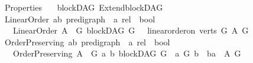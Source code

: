 %
\begin{isabellebody}%
%
%
\isadelimtheory
%
\endisadelimtheory
%
\isatagtheory
{}\isamarkupfalse%
\ Properties\isanewline
\ \ \ blockDAG\ Extend{\isacharunderscore}{\kern0pt}blockDAG\ \isanewline
{}%
\endisatagtheory
{\isafoldtheory}%
%
\isadelimtheory
\isanewline
%
\endisadelimtheory
\isanewline
{}\isamarkupfalse%
\ Linear{\isacharunderscore}{\kern0pt}Order{\isacharcolon}{\kern0pt}{\isacharcolon}{\kern0pt}\ {\isachardoublequoteopen}{\isacharparenleft}{\kern0pt}{\isacharparenleft}{\kern0pt}{\isacharprime}{\kern0pt}a{\isacharcomma}{\kern0pt}{\isacharprime}{\kern0pt}b{\isacharparenright}{\kern0pt}\ pre{\isacharunderscore}{\kern0pt}digraph\ {\isasymRightarrow}\ {\isacharprime}{\kern0pt}a\ rel{\isacharparenright}{\kern0pt}\ {\isasymRightarrow}\ bool{\isachardoublequoteclose}\isanewline
\ \ \ {\isachardoublequoteopen}Linear{\isacharunderscore}{\kern0pt}Order\ A\ {\isasymequiv}\ {\isacharparenleft}{\kern0pt}{\isasymforall}G{\isachardot}{\kern0pt}\ blockDAG\ G\ \ {\isasymlongrightarrow}\ linear{\isacharunderscore}{\kern0pt}order{\isacharunderscore}{\kern0pt}on\ {\isacharparenleft}{\kern0pt}verts\ G{\isacharparenright}{\kern0pt}\ {\isacharparenleft}{\kern0pt}A\ G{\isacharparenright}{\kern0pt}{\isacharparenright}{\kern0pt}{\isachardoublequoteclose}\isanewline
\isanewline
\isanewline
{}\isamarkupfalse%
\ Order{\isacharunderscore}{\kern0pt}Preserving{\isacharcolon}{\kern0pt}{\isacharcolon}{\kern0pt}\ {\isachardoublequoteopen}{\isacharparenleft}{\kern0pt}{\isacharparenleft}{\kern0pt}{\isacharprime}{\kern0pt}a{\isacharcomma}{\kern0pt}{\isacharprime}{\kern0pt}b{\isacharparenright}{\kern0pt}\ pre{\isacharunderscore}{\kern0pt}digraph\ {\isasymRightarrow}\ {\isacharprime}{\kern0pt}a\ rel{\isacharparenright}{\kern0pt}\ {\isasymRightarrow}\ bool\ {\isachardoublequoteclose}\isanewline
\ \ \ {\isachardoublequoteopen}Order{\isacharunderscore}{\kern0pt}Preserving\ A\ {\isasymequiv}\ {\isacharparenleft}{\kern0pt}{\isasymforall}G\ a\ b{\isachardot}{\kern0pt}\ blockDAG\ G\ {\isasymlongrightarrow}\ a\ {\isasymrightarrow}\isactrlsup {\isacharplus}{\kern0pt}\isactrlbsub G\isactrlesub \ b\ {\isasymlongrightarrow}\ {\isacharparenleft}{\kern0pt}b{\isacharcomma}{\kern0pt}a{\isacharparenright}{\kern0pt}\ {\isasymin}\ {\isacharparenleft}{\kern0pt}A\ G{\isacharparenright}{\kern0pt}{\isacharparenright}{\kern0pt}{\isachardoublequoteclose}\isanewline
\isanewline
\isanewline
{}\isamarkupfalse%

\end{isabellebody}
